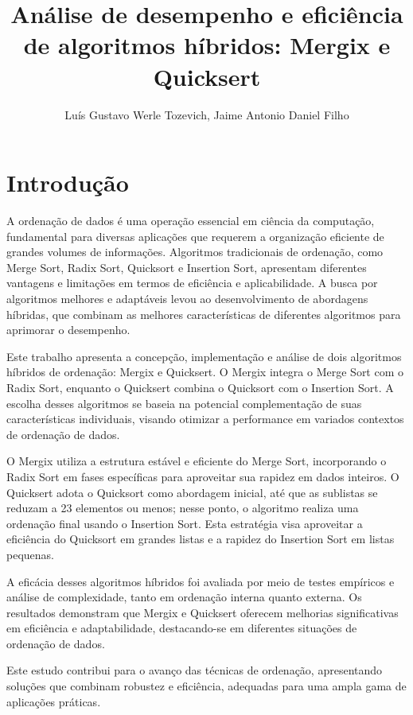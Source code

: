 \documentclass[12pt]{article}
\title{Análise de desempenho e eficiência de algoritmos híbridos: Mergix e Quicksert}
\author{Luís Gustavo Werle Tozevich\inst{1}, Jaime Antonio Daniel Filho\inst{1}}
\begin{document}
 

\maketitle

\section{Introdução}

A ordenação de dados é uma operação essencial em ciência da computação, fundamental para diversas aplicações que requerem a organização eficiente de grandes volumes de informações. Algoritmos tradicionais de ordenação, como Merge Sort, Radix Sort, Quicksort e Insertion Sort, apresentam diferentes vantagens e limitações em termos de eficiência e aplicabilidade. A busca por algoritmos melhores e adaptáveis levou ao desenvolvimento de abordagens híbridas, que combinam as melhores características de diferentes algoritmos para aprimorar o desempenho.

Este trabalho apresenta a concepção, implementação e análise de dois algoritmos híbridos de ordenação: Mergix e Quicksert. O Mergix integra o Merge Sort com o Radix Sort, enquanto o Quicksert combina o Quicksort com o Insertion Sort. A escolha desses algoritmos se baseia na potencial complementação de suas características individuais, visando otimizar a performance em variados contextos de ordenação de dados.

O Mergix utiliza a estrutura estável e eficiente do Merge Sort, incorporando o Radix Sort em fases específicas para aproveitar sua rapidez em dados inteiros. O Quicksert adota o Quicksort como abordagem inicial, até que as sublistas se reduzam a 23 elementos ou menos; nesse ponto, o algoritmo realiza uma ordenação final usando o Insertion Sort. Esta estratégia visa aproveitar a eficiência do Quicksort em grandes listas e a rapidez do Insertion Sort em listas pequenas.

A eficácia desses algoritmos híbridos foi avaliada por meio de testes empíricos e análise de complexidade, tanto em ordenação interna quanto externa. Os resultados demonstram que Mergix e Quicksert oferecem melhorias significativas em eficiência e adaptabilidade, destacando-se em diferentes situações de ordenação de dados.

Este estudo contribui para o avanço das técnicas de ordenação, apresentando soluções que combinam robustez e eficiência, adequadas para uma ampla gama de aplicações práticas.
\end{document}
